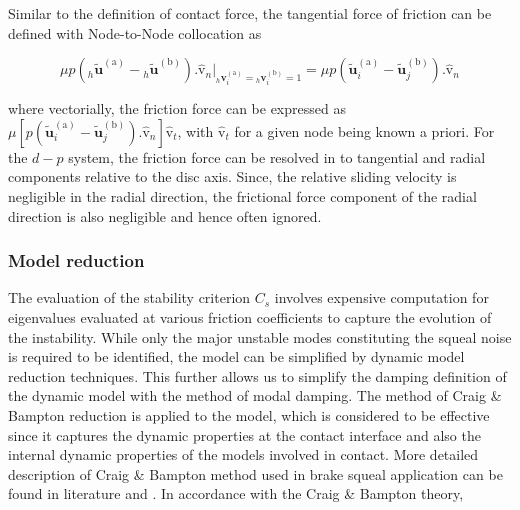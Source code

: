Similar to the definition of contact force, the tangential force of friction can be defined with Node-to-Node collocation as 

\begin{equation}
  \mu \mathit{p}({{}_h\widetilde{\bm u}}^{(\mathrm a)} - {{}_h \widetilde{\bm u}}^{ ( \mathrm b)}). \bm{\hat{\mathrm v}}_n\bigg|_{ {}_h \bm v_i^\mathrm{(a)}= {}_h \bm v_i^\mathrm{(b)}=1}  = \mu p ( \widetilde{ \bm u}_{{i}}^{(\mathrm a)}- \widetilde{ \bm u}_{{j}}^{(\mathrm b)}). \bm{\hat{\mathrm v}}_n
\end{equation}

where vectorially, the friction force can be expressed as $\mu [p ( \widetilde{ \bm u}_{{i}}^{(\mathrm a)}- \widetilde{ \bm u}_{{j}}^{(\mathrm b)}). \bm{\hat{\mathrm v}}_n]\bm{\hat{\mathrm v}}_t$, with $\bm{\hat{\mathrm v}}_t$ for a given node being known a priori. For the $d-p$ system, the friction force can be resolved in to tangential and radial components relative to the disc axis. Since, the relative sliding velocity is negligible in the radial direction, the frictional force component of the radial direction is also negligible and hence often ignored. 

\iffalse
\subsubsection{Model reduction}

The evaluation of the stability criterion $C_s$ involves expensive computation for eigenvalues evaluated at various friction coefficients to capture the evolution of the instability. While only the major unstable modes constituting the squeal noise is required to be identified, the model can be simplified by dynamic model reduction techniques. This further allows us to simplify the damping definition of the dynamic model with the method of modal damping. The method of Craig \& Bampton reduction is applied to the model, which is considered to be effective since it captures the dynamic properties at the contact interface and also the internal dynamic properties of the models involved in contact. More detailed description of Craig \& Bampton method used in brake squeal application can be found in literature \cite{BESSET2017896} and \cite{MONTEIL20161073}.   In accordance with the Craig \& Bampton theory,

